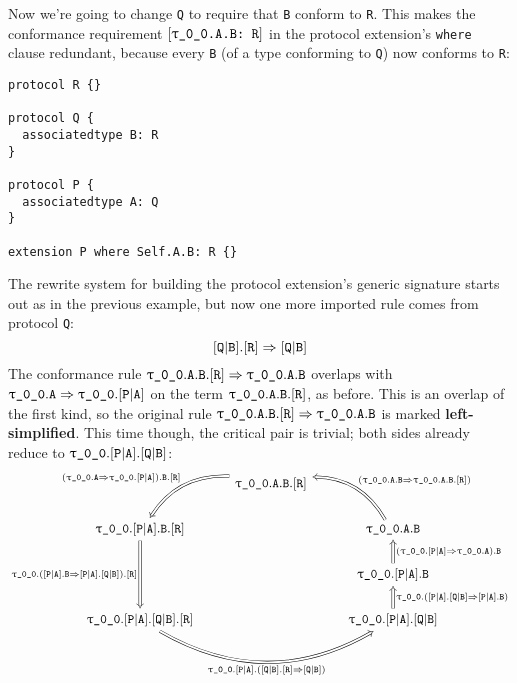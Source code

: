 \documentclass[../generics]{subfiles}
\begin{document}
\begin{example}
Now we're going to change \texttt{Q} to require that \texttt{B} conform to \texttt{R}. This makes the conformance requirement $[\texttt{\texttt{$\uptau$\_0\_0}.A.B:~R}]$ in the protocol extension's \texttt{where} clause redundant, because every \texttt{B} (of a type conforming to \texttt{Q}) now conforms to \texttt{R}:
\begin{Verbatim}
protocol R {}

protocol Q {
  associatedtype B: R
}

protocol P {
  associatedtype A: Q
}

extension P where Self.A.B: R {}
\end{Verbatim}
The rewrite system for building the protocol extension's generic signature starts out as in the previous example, but now one more imported rule comes from protocol \texttt{Q}:
\[[\texttt{Q}|\texttt{B}].[\texttt{R}]\Rightarrow [\texttt{Q}|\texttt{B}]\]
The conformance rule $\texttt{$\uptau$\_0\_0}.\texttt{A}.\texttt{B}.[\texttt{R}]\Rightarrow \texttt{$\uptau$\_0\_0}.\texttt{A}.\texttt{B}$ overlaps with $\texttt{$\uptau$\_0\_0}.\texttt{A}\Rightarrow\texttt{$\uptau$\_0\_0}.[\texttt{P}|\texttt{A}]$ on the term $\texttt{$\uptau$\_0\_0}.\texttt{A}.\texttt{B}.[\texttt{R}]$, as before. This is an overlap of the first kind, so the original rule $\texttt{$\uptau$\_0\_0}.\texttt{A}.\texttt{B}.[\texttt{R}]\Rightarrow \texttt{$\uptau$\_0\_0}.\texttt{A}.\texttt{B}$ is marked \textbf{left-simplified}. This time though, the critical pair is trivial; both sides already reduce to $\texttt{$\uptau$\_0\_0}.[\texttt{P}|\texttt{A}].[\texttt{Q}|\texttt{B}]$:
\[
\begin{tikzcd}
&\ttgp{0}{0}.\texttt{A}.\texttt{B}.\protosym{R}
\arrow[ld, Rightarrow, bend right, "(\ttgp{0}{0}.\texttt{A}\Rightarrow\ttgp{0}{0}.\assocsym{P}{A}).\texttt{B}.\protosym{R}"']\\
\ttgp{0}{0}.\assocsym{P}{A}.\texttt{B}.\protosym{R}
\arrow[dd, Rightarrow, "\ttgp{0}{0}.(\assocsym{P}{A}.\texttt{B}\Rightarrow\assocsym{P}{A}.\assocsym{Q}{B}).\protosym{R}"']&&
\ttgp{0}{0}.\texttt{A}.\texttt{B}
\arrow[lu, Rightarrow, bend right, "(\ProtoConfInv{\ttgp{0}{0}.\texttt{A}.\texttt{B}}{R})"']
\\
&&
\ttgp{0}{0}.\assocsym{P}{A}.\texttt{B}
\arrow[u, Rightarrow, "(\ttgp{0}{0}.\assocsym{P}{A}\Rightarrow\ttgp{0}{0}.\texttt{A}).\texttt{B}"']
\\
\ttgp{0}{0}.\assocsym{P}{A}.\assocsym{Q}{B}.\protosym{R}
\arrow[rr, Rightarrow, bend right, "\ttgp{0}{0}.\assocsym{P}{A}.(\ProtoConf{\assocsym{Q}{B}}{R})"']
&&
\ttgp{0}{0}.\assocsym{P}{A}.\assocsym{Q}{B}
\arrow[u, Rightarrow, "\ttgp{0}{0}.(\assocsym{P}{A}.\assocsym{Q}{B}\Rightarrow\assocsym{P}{A}.\texttt{B})"']&&
\end{tikzcd}
\]
\end{example}
\end{document}
